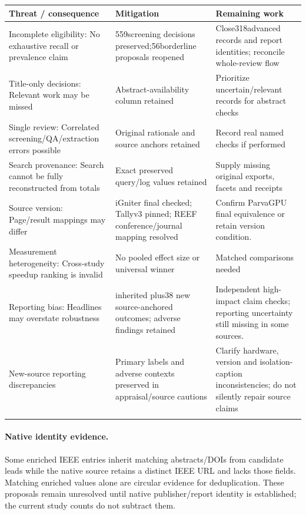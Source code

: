 \begin{longtable}{>{\raggedright\arraybackslash}p{}>{\raggedright\arraybackslash}p{}>{\raggedright\arraybackslash}p{}}
\toprule
\textbf{Threat / consequence} & \textbf{Mitigation} & \textbf{Remaining work}\\\midrule\endhead
Incomplete eligibility: No exhaustive recall or prevalence claim & 559screening decisions preserved;56borderline proposals reopened & Close318advanced records and report identities; reconcile whole-review flow\\\addlinespace
Title-only decisions: Relevant work may be missed & Abstract-availability column retained & Prioritize uncertain/relevant records for abstract checks\\\addlinespace
Single review: Correlated screening/QA/extraction errors possible & Original rationale and source anchors retained & Record real named checks if performed\\\addlinespace
Search provenance: Search cannot be fully reconstructed from totals & Exact preserved query/log values retained & Supply missing original exports, facets and receipts\\\addlinespace
Source version: Page/result mappings may differ & iGniter final checked; Tallyv3 pinned; REEF conference/journal mapping resolved & Confirm ParvaGPU final equivalence or retain version condition.\\\addlinespace
Measurement heterogeneity: Cross-study speedup ranking is invalid & No pooled effect size or universal winner & Matched comparisons needed\\\addlinespace
Reporting bias: Headlines may overstate robustness & 52 inherited plus38 new source-anchored outcomes; adverse findings retained & Independent high-impact claim checks; reporting uncertainty still missing in some sources.\\\addlinespace
New-source reporting discrepancies & Primary labels and adverse contexts preserved in appraisal/source cautions & Clarify hardware, version and isolation-caption inconsistencies; do not silently repair source claims\\\addlinespace
\bottomrule\end{longtable}\paragraph{Native identity evidence.} Some enriched IEEE entries inherit matching abstracts/DOIs from candidate leads while the native source retains a distinct IEEE URL and lacks those fields. Matching enriched values alone are circular evidence for deduplication. These proposals remain unresolved until native publisher/report identity is established; the current study counts do not subtract them.
